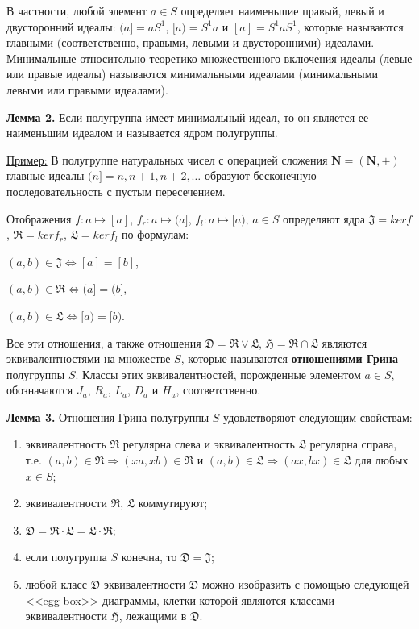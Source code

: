 \documentclass[spec, och, labwork]{shiza}
\begin{document}
    В частности, любой элемент $a \in S$ определяет наименьшие правый, левый и двусторонний идеалы: $(a] = aS^1$, $[a) = S^1a$ и
    $[a] = S^1aS^1$, которые называются главными (соответственно, правыми, левыми и двусторонними) идеалами.
    Минимальные относительно теоретико-множественного включения идеалы (левые или правые идеалы) называются минимальными идеалами
    (минимальными левыми или правыми идеалами).
    
    \textbf{Лемма 2.} Если полугруппа имеет минимальный идеал, то он является ее наименьшим идеалом и называется ядром полугруппы.

    \underline{Пример:} В полугруппе натуральных чисел с операцией сложения $\textbf{N} = (\textbf{N}, +)$ главные идеалы 
    $(n] = {n, n + 1, n + 2, \dots}$ образуют бесконечную последовательность с пустым пересечением.

    \begin{center}
      Отображения $f: a \mapsto [a]$, $f_r: a \mapsto (a]$, $f_l: a \mapsto [a)$, $a \in S$ определяют ядра $\mathfrak{J} = ker f$,
      $\mathfrak{R} = ker f_r$, $\mathfrak{L} = ker f_l$ по формулам:

      $(a, b) \in \mathfrak{J} \Longleftrightarrow [a] = [b]$,

      $(a, b) \in \mathfrak{R} \Longleftrightarrow (a] = (b]$,

      $(a, b) \in \mathfrak{L} \Longleftrightarrow [a) = [b)$.
    \end{center}

    Все эти отношения, а также отношения $\mathfrak{D}  = \mathfrak{R} \vee \mathfrak{L}$, $\mathfrak{H}  = \mathfrak{R} \cap \mathfrak{L}$
    являются эквивалентностями на множестве $S$, которые называются \textbf{отношениями Грина} полугруппы $S$. Классы этих эквивалентностей,
    порожденные элементом $a \in S$, обозначаются $J_a$, $R_a$, $L_a$, $D_a$ и $H_a$, соответственно.
  
    \textbf{Лемма 3.} Отношения Грина полугруппы $S$ удовлетворяют следующим свойствам:

    \begin{enumerate}
      \item эквивалентность $\mathfrak{R}$ регулярна слева и эквивалентность $\mathfrak{L}$ регулярна справа, т.е.
      $(a, b) \in \mathfrak{R} \Rightarrow (xa, xb) \in \mathfrak{R}$ и $(a, b) \in \mathfrak{L} \Rightarrow (ax, bx) \in \mathfrak{L}$ 
      для любых $x \in S$;
      \item эквивалентности $\mathfrak{R}$, $\mathfrak{L}$ коммутируют;
      \item $\mathfrak{D} = \mathfrak{R} \cdot \mathfrak{L} = \mathfrak{L} \cdot \mathfrak{R}$;
      \item если полугруппа $S$ конечна, то $\mathfrak{D} = \mathfrak{J}$;
      \item любой класс $\mathfrak{D}$ эквивалентности $\mathfrak{D}$ можно изобразить с помощью следующей <<egg-box>>-диаграммы,
      клетки которой являются классами эквивалентности $\mathfrak{H}$, лежащими в $\mathfrak{D}$.
    \end{enumerate}
\end{document}

